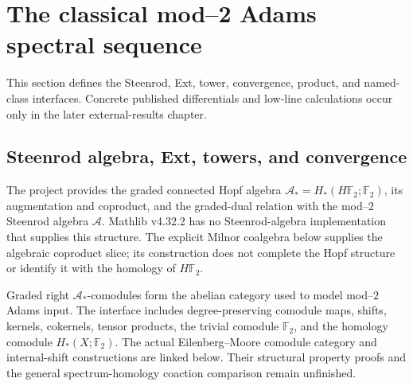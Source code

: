 \section{The classical mod--2 Adams spectral sequence}
\label{chap:classical-adams}

This section defines the Steenrod, Ext, tower, convergence, product, and named-class interfaces.  Concrete published differentials and low-line calculations occur only in the later external-results chapter.

\subsection{Steenrod algebra, Ext, towers, and convergence}

\begin{definition}
  \label{def:dual-steenrod-algebra}
  \notready
  The project provides the graded connected Hopf algebra
  $\mathcal A_*=H_*(H\mathbb F_2;\mathbb F_2)$, its augmentation and coproduct,
  and the graded-dual relation with the mod--$2$ Steenrod algebra $\mathcal A$.
  Mathlib v4.32.2 has no Steenrod-algebra implementation that supplies this
  structure.
  The explicit Milnor coalgebra below supplies the algebraic coproduct
  slice; its construction does not complete the Hopf structure or identify
  it with the homology of $H\mathbb F_2$.
\end{definition}

\begin{definition}
  \label{def:steenrod-comodule-category}
  \notready
  Graded right $\mathcal A_*$-comodules form the abelian category used to model
  mod--$2$ Adams input.  The interface includes degree-preserving comodule
  maps, shifts, kernels, cokernels, tensor products, the trivial comodule
  $\mathbb F_2$, and the homology comodule $H_*(X;\mathbb F_2)$.
  The actual Eilenberg--Moore comodule category and internal-shift
  constructions are linked below. Their structural property proofs and
  the general spectrum-homology coaction comparison remain unfinished.
\end{definition}

